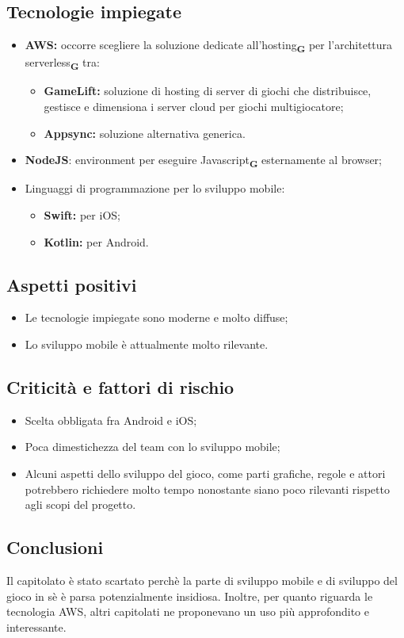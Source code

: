 \subsection{Tecnologie impiegate}
\begin{itemize}
    \item \textbf{AWS:} occorre scegliere la soluzione dedicate all'hosting\textsubscript{\textbf{G}} per l'architettura serverless\textsubscript{\textbf{G}} tra:
          \begin{itemize}
              \item \textbf{GameLift:} soluzione di hosting di server di giochi che distribuisce, gestisce e dimensiona i server cloud per giochi multigiocatore;
              \item \textbf{Appsync:} soluzione alternativa generica.
          \end{itemize}
    \item \textbf{NodeJS}: environment per eseguire Javascript\textsubscript{\textbf{G}} esternamente al browser;
    \item Linguaggi di programmazione per lo sviluppo mobile:
          \begin{itemize}
              \item \textbf{Swift:} per iOS;
              \item \textbf{Kotlin:} per Android.
          \end{itemize}
\end{itemize}
\subsection{Aspetti positivi}
\begin{itemize}
    \item Le tecnologie impiegate sono moderne e molto diffuse;
    \item Lo sviluppo mobile è attualmente molto rilevante.
\end{itemize}
\subsection{Criticità e fattori di rischio}
\begin{itemize}
    \item Scelta obbligata fra Android e iOS;
    \item Poca dimestichezza del team con lo sviluppo mobile;
    \item Alcuni aspetti dello sviluppo del gioco, come parti grafiche, regole e attori potrebbero richiedere molto tempo nonostante siano poco rilevanti rispetto agli scopi del progetto.
\end{itemize}
\subsection{Conclusioni}
Il capitolato è stato scartato perchè la parte di sviluppo mobile e di sviluppo del gioco in sè è parsa potenzialmente insidiosa. Inoltre, per quanto riguarda le tecnologia AWS, altri capitolati ne proponevano un uso più approfondito e interessante.